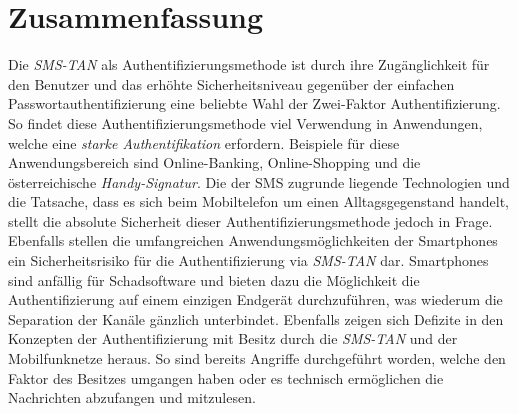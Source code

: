 \documentclass[11pt,a4paper,ngerman]{scrreprt}
\begin{document}
\section{Zusammenfassung}
Die \textit{SMS-TAN} als Authentifizierungsmethode ist durch ihre Zugänglichkeit für den Benutzer und das erhöhte Sicherheitsniveau gegenüber der einfachen Passwortauthentifizierung eine beliebte Wahl der Zwei-Faktor Authentifizierung. So findet diese Authentifizierungsmethode viel Verwendung in Anwendungen, welche eine \emph{starke Authentifikation} erfordern. Beispiele für diese Anwendungsbereich sind Online-Banking, Online-Shopping und die österreichische \textit{Handy-Signatur}. Die der SMS zugrunde liegende Technologien und die Tatsache, dass es sich beim Mobiltelefon um einen Alltagsgegenstand handelt, stellt die absolute Sicherheit dieser Authentifizierungsmethode jedoch in Frage. Ebenfalls stellen die umfangreichen Anwendungsmöglichkeiten der Smartphones ein Sicherheitsrisiko für die Authentifizierung via \textit{SMS-TAN} dar. Smartphones sind anfällig für Schadsoftware und bieten dazu die Möglichkeit die Authentifizierung auf einem einzigen Endgerät durchzuführen, was wiederum die Separation der Kanäle gänzlich unterbindet. Ebenfalls zeigen sich Defizite in den Konzepten der Authentifizierung mit Besitz durch die \textit{SMS-TAN} und der Mobilfunknetze heraus. So sind bereits Angriffe durchgeführt worden, welche den Faktor des Besitzes umgangen haben oder es technisch ermöglichen die Nachrichten abzufangen und mitzulesen.
\end{document}
